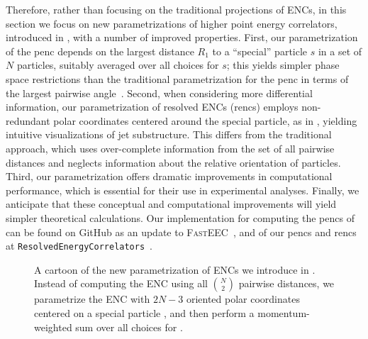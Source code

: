 Therefore, rather than focusing on the traditional projections of ENCs, in this section we focus on new parametrizations of higher point energy correlators, introduced in , with a number of improved properties.
%
First, our parametrization of the \gls{penc} depends on the largest distance \(R_1\) to a ``special'' particle $s$ in a set of $N$ particles, suitably averaged over all choices for $s$;
%
this yields simpler phase space restrictions than the traditional parametrization for the \gls{penc} in terms of the largest pairwise angle~\cite{Chen:2020vvp}.
%
Second, when considering more differential information, our parametrization of resolved ENCs (\gls{renc}s) employs non-redundant polar coordinates centered around the special particle, as in , yielding intuitive visualizations of jet substructure.
%
This differs from the traditional approach, which uses over-complete information from the set of all pairwise distances and neglects information about the relative orientation of particles.
%
Third, our parametrization offers dramatic improvements in computational performance, which is essential for their use in experimental analyses.
%
Finally, we anticipate that these conceptual and computational improvements will yield simpler theoretical calculations.
%
Our implementation for computing the \glspl{penc} of  can be found on GitHub as an update to \textsc{FastEEC}~\cite{Budhraja:2024xiq}, and of our \glspl{penc} and \gls{renc}s at \texttt{ResolvedEnergyCorrelators}~\cite{github:RENC}.


\begin{figure}
    \centering
    \scalebox{1.2}{
        
    }
    \caption[Cartoon of the new parametrization of ENCs introduced by the author and collaborators]{
        A cartoon of the new parametrization of ENCs we introduce in .
        Instead of computing the ENC using all \(\binom{N}{2}\) pairwise distances, we parametrize the ENC with \(2N - 3\) oriented polar coordinates centered on a special particle \izero{}, and then perform a momentum-weighted sum over all choices for \izero{}.
    }
	\label{fig:cartoon}
\end{figure}


